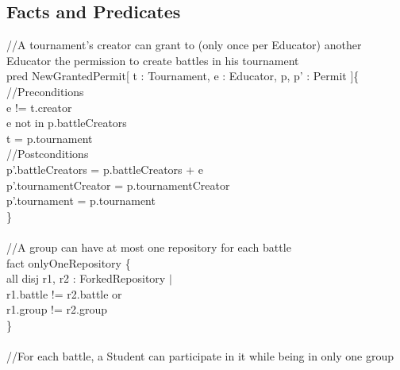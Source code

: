 \documentclass{article}
\begin{document}
{\subsection{Facts and Predicates}
\color{gray}
//A tournament's creator can grant to (only once per Educator) another Educator the permission to create battles in his tournament\\
\color{black}
\color{blue} pred \color{black} NewGrantedPermit[ t : Tournament, e : Educator, p, p' : Permit ]\{\\
\color{gray}
//Preconditions\\
\color{black}
\-\hspace{1cm}e \color{blue} != \color{black} t.creator\\
\-\hspace{1cm}e \color{blue} not in \color{black} p.battleCreators\\
\-\hspace{1cm}t \color{blue} = \color{black} p.tournament\\
\color{gray}
//Postconditions\\
\-\hspace{1cm}\color{black}p'.battleCreators \color{blue} = \color{black} p.battleCreators \color{blue} + \color{black} e\\
\-\hspace{1cm}p'.tournamentCreator \color{blue} = \color{black} p.tournamentCreator\\
\-\hspace{1cm}p'.tournament \color{blue} = \color{black} p.tournament\\
\noindent
\}\\
\\
\color{gray}
//A group can have at most one repository for each battle\\
\color{blue} fact \color{black} onlyOneRepository \{\\
\-\hspace{1cm}\color{blue}all disj \color{black} r1, r2 : ForkedRepository $|$ \\
\-\hspace{1cm}r1.battle \color{blue} != \color{black} r2.battle \color{blue} or \color{black}\\
\-\hspace{1cm}r1.group \color{blue} != \color{black} r2.group \\
\}\\
\\
\color{gray}
//For each battle, a Student can participate in it while being in only one group\\
}
\end{document}
